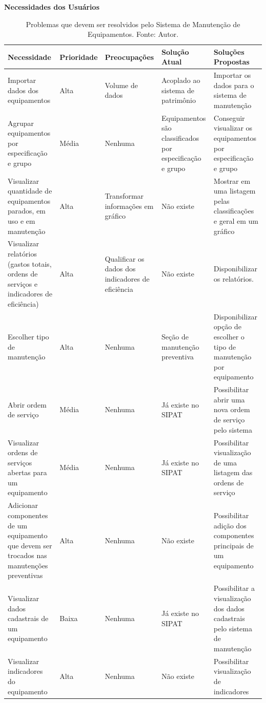 \pagebreak

\textbf{Necessidades dos Usuários}


\begin{table}[H]
\centering
\caption{Problemas que devem ser resolvidos pelo Sistema de Manutenção de Equipamentos. Fonte: Autor.}
\label{tab-necessidade}
\begin{tabular}{ | p{3cm} | p{2cm} | p{3cm} | p{3cm} | p{4cm} |}
\hline
	\textbf{Necessidade} & \textbf{Prioridade} & \textbf{Preocupações} & \textbf{Solução Atual} & \textbf{Soluções Propostas} \\ \hline
	Importar dados dos equipamentos & Alta & Volume de dados & Acoplado ao sistema de patrimônio & Importar os dados para o sistema de manutenção \\ \hline
	Agrupar equipamentos por especificação e grupo & Média & Nenhuma & Equipamentos são classificados por especificação e grupo & Conseguir visualizar os equipamentos por especificação e grupo \\ \hline
	Visualizar quantidade de equipamentos parados, em uso e em manutenção & Alta & Transformar informações em gráfico & Não existe & Mostrar em uma listagem pelas classificações e geral em um gráfico \\ \hline
	Visualizar relatórios (gastos totais, ordens de serviços e indicadores de eficiência) & Alta & Qualificar os dados dos indicadores de eficiência & Não existe & Disponibilizar os relatórios. \\ \hline
	Escolher tipo de manutenção & Alta & Nenhuma & Seção de manutenção preventiva & Disponibilizar opção de escolher o tipo de manutenção por equipamento \\ \hline
	Abrir ordem de serviço & Média & Nenhuma & Já existe no SIPAT & Possibilitar abrir uma nova ordem de serviço pelo sistema  \\ \hline
	Visualizar ordens de serviços abertas para um equipamento & Média & Nenhuma & Já existe no SIPAT & Possibilitar visualização de uma listagem das ordens de serviço \\ \hline
	Adicionar  componentes de um equipamento que devem ser trocados nas manutenções preventivas & Alta & Nenhuma & Não existe & Possibilitar adição dos componentes principais de um equipamento \\ \hline
	Visualizar dados cadastrais de um equipamento & Baixa & Nenhuma & Já existe no SIPAT & Possibilitar a visualização dos dados cadastrais pelo sistema de manutenção \\ \hline
	Visualizar indicadores do equipamento & Alta & Nenhuma & Não existe & Possibilitar visualização de indicadores \\ \hline
\end{tabular}
\end{table}
 
